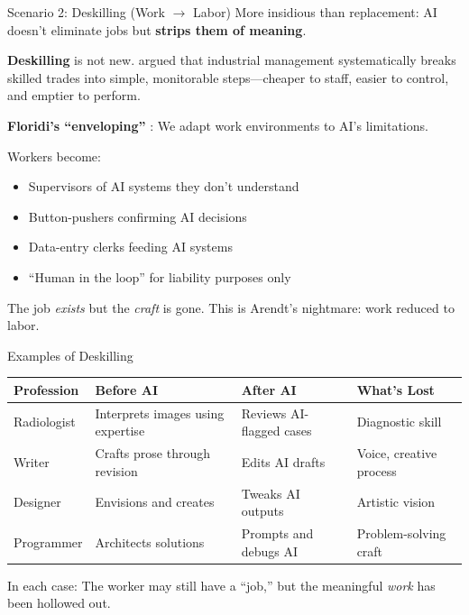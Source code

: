﻿\documentclass[aspectratio=169,11pt]{beamer}
\begin{document}
\begin{frame}{Scenario 2: Deskilling (Work $\rightarrow$ Labor)}
More insidious than replacement: AI doesn't eliminate jobs but \textbf{strips them of meaning}.

\vspace{0.2em}
\textbf{Deskilling} is not new. \textcite{braverman_labor_monopoly} argued that industrial management systematically breaks skilled trades into simple, monitorable steps---cheaper to staff, easier to control, and emptier to perform.

\vspace{0.2em}
\textbf{Floridi's ``enveloping''} \parencite{floridi_ethics_ai}: We adapt work environments to AI's limitations.

\vspace{0.2em}
Workers become:
\begin{itemize}
    \item Supervisors of AI systems they don't understand
    \item Button-pushers confirming AI decisions
    \item Data-entry clerks feeding AI systems
    \item ``Human in the loop'' for liability purposes only
\end{itemize}

\vspace{0.2em}
The job \emph{exists} but the \emph{craft} is gone. This is Arendt's nightmare: work reduced to labor.
\end{frame}

\begin{frame}{Examples of Deskilling}
\begin{table}[h]
\centering
\scriptsize
\begin{tabular}{@{}p{2cm}p{3.2cm}p{3.2cm}p{3.2cm}@{}}
\toprule
\textbf{Profession} & \textbf{Before AI} & \textbf{After AI} & \textbf{What's Lost} \\
\midrule
Radiologist & Interprets images using expertise & Reviews AI-flagged cases & Diagnostic skill \\
\addlinespace
Writer & Crafts prose through revision & Edits AI drafts & Voice, creative process \\
\addlinespace
Designer & Envisions and creates & Tweaks AI outputs & Artistic vision \\
\addlinespace
Programmer & Architects solutions & Prompts and debugs AI & Problem-solving craft \\
\bottomrule
\end{tabular}
\end{table}

\vspace{0.2em}
In each case: The worker may still have a ``job,'' but the meaningful \emph{work} has been hollowed out.
\end{frame}
\end{document}
